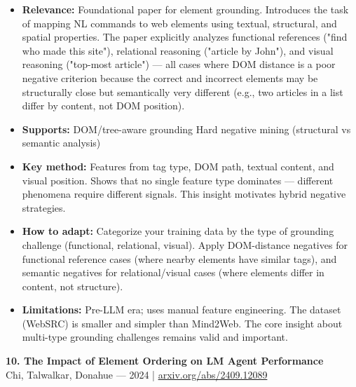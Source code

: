 \documentclass[pdflatex,sn-mathphys-num]{sn-jnl}
\theoremstyle{thmstyleone}
\theoremstyle{thmstyletwo}
\theoremstyle{thmstylethree}
\begin{document}
\begin{itemize}
    \item \textbf{Relevance:} Foundational paper for element grounding. Introduces the task of mapping NL commands to web elements using textual, structural, and spatial properties. The paper explicitly analyzes functional references ("find who made this site"), relational reasoning ("article by John"), and visual reasoning ("top-most article") --- all cases where DOM distance is a poor negative criterion because the correct and incorrect elements may be structurally close but semantically very different (e.g., two articles in a list differ by content, not DOM position).
    \item \textbf{Supports:} \checkmark DOM/tree-aware grounding \checkmark Hard negative mining (structural vs semantic analysis)
    \item \textbf{Key method:} Features from tag type, DOM path, textual content, and visual position. Shows that no single feature type dominates --- different phenomena require different signals. This insight motivates hybrid negative strategies.
    \item \textbf{How to adapt:} Categorize your training data by the type of grounding challenge (functional, relational, visual). Apply DOM-distance negatives for functional reference cases (where nearby elements have similar tags), and semantic negatives for relational/visual cases (where elements differ in content, not structure).
    \item \textbf{Limitations:} Pre-LLM era; uses manual feature engineering. The dataset (WebSRC) is smaller and simpler than Mind2Web. The core insight about multi-type grounding challenges remains valid and important.
\end{itemize}

\textbf{10. The Impact of Element Ordering on LM Agent Performance} \\
Chi, Talwalkar, Donahue --- 2024 | \href{https://arxiv.org/abs/2409.12089}{arxiv.org/abs/2409.12089}
\end{document}
